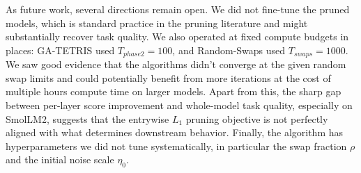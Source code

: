 As future work, several directions remain open. We did not fine-tune the pruned models, which is standard practice in the pruning literature and might substantially recover task quality. We also operated at fixed compute budgets in places: GA-TETRIS used $T_{phase2} = 100$, and Random-Swaps used $T_{swaps} = 1000$. We saw good evidence that the algorithms didn't converge at the given random swap limits and could potentially benefit from more iterations at the cost of multiple hours compute time on larger models. Apart from this, the sharp gap between per-layer score improvement and whole-model task quality, especially on SmolLM2, suggests that the entrywise $L_1$ pruning objective is not perfectly aligned with what determines downstream behavior. Finally, the algorithm has hyperparameters we did not tune systematically, in particular the swap fraction $\rho$ and the initial noise scale $\eta_0$.
